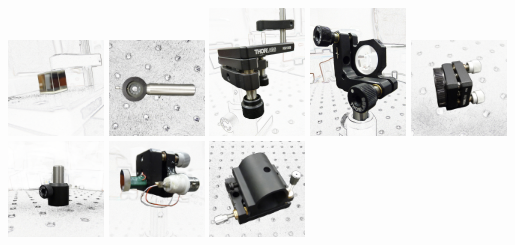 




\includegraphics[width=1in]{BeamSplitterCube}
\includegraphics[width=1in]{Iris}
\includegraphics[width=1in]{KinematicPlatformMount}
\includegraphics[width=1in]{LensinHolder}
\includegraphics[width=1in]{MirrorMount}
\includegraphics[width=1in]{OpticalPostwPostHolder}
\includegraphics[width=1in]{PiezoandMirror}
\includegraphics[width=1in]{ULMTiltKinematicLaserMount}